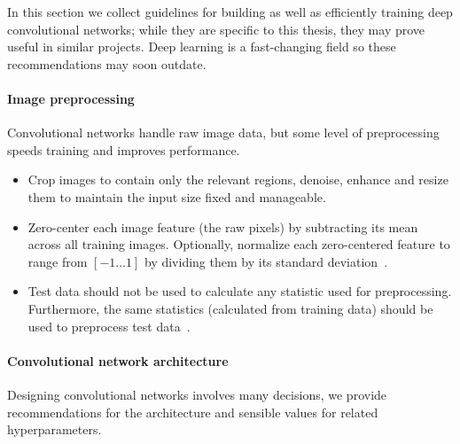 In this section we collect guidelines for building as well as efficiently training deep convolutional networks; while they are specific to this thesis, they may prove useful in similar projects. Deep learning is a fast-changing field so these recommendations may soon outdate.

\paragraph{Image preprocessing} Convolutional networks handle raw image data, but some level of preprocessing speeds training and improves performance.
\begin{itemize}
	\item Crop images to contain only the relevant regions, denoise, enhance and resize them to maintain the input size fixed and manageable.

	\item Zero-center each image feature (the raw pixels) by subtracting its mean across all training images. Optionally, normalize each zero-centered feature to range from $[-1 \dots 1]$ by dividing them by its standard deviation~\cite{Karpathy2016}.

	\item Test data should not be used to calculate any statistic used for preprocessing. Furthermore, the same statistics (calculated from training data) should be used to preprocess test data~\cite{Karpathy2016}.
\end{itemize}

\paragraph{Convolutional network architecture} Designing convolutional networks involves many decisions, we provide recommendations for the architecture and sensible values for related hyperparameters.

